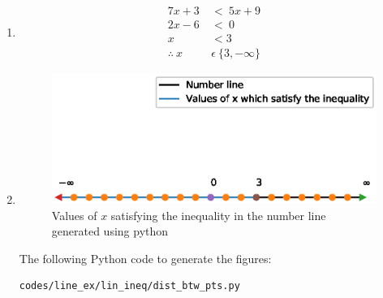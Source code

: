 \renewcommand{\theequation}{\theenumi}
\begin{enumerate}

\item \begin{align}
7x+3\ &<\ 5x+9 \\
2x - 6\  &< \  0 \\
x &< 3 \\
\therefore\  x\  &\epsilon\  \{3, -\infty \}
\end{align}

\item \begin{figure}[!ht]
\centering
\includegraphics[width=\columnwidth]{./figs/line_ex/lin_ineq/number_line.eps}
\caption{Values of $x$ satisfying the inequality in the number line generated using python}
\label{fig:numberline_lin_ineq}
\end{figure} 

The  following Python code to generate the figures:
\begin{lstlisting}
codes/line_ex/lin_ineq/dist_btw_pts.py
\end{lstlisting}
\end{enumerate}
\pagebreak


